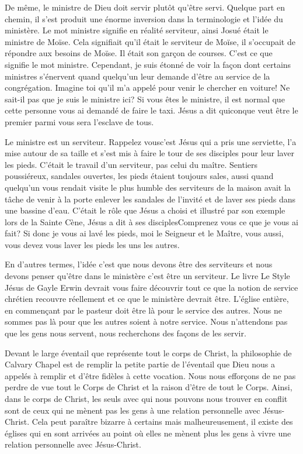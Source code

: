 De même, le ministre de Dieu doit servir plutôt qu’être servi. Quelque part en chemin, il s’est produit une énorme
inversion dans la terminologie et l’idée du ministère. Le mot \og ministre\fg{} signifie en réalité \og serviteur\fg{}, ainsi Josué était
le ministre de Moïse. Cela signifiait qu’il était le serviteur de Moïse, il s’occupait de répondre aux besoins de Moïse. Il
était son garçon de courses. C’est ce que signifie le mot \og ministre\fg{}. Cependant, je suis étonné de voir la façon dont
certains ministres s’énervent quand quelqu’un leur demande d'être au service de la congrégation. \og Imagine toi qu’il
m’a appelé pour venir le chercher en voiture! Ne sait-il pas que je suis le ministre ici?\fg{} Si vous êtes le ministre, il est
normal que cette personne vous ai demandé de faire le taxi. Jésus a dit \og quiconque veut être le premier parmi vous
sera l’esclave de tous.\fg{}

Le ministre est un serviteur. Rappelez vous\frcolon c’est Jésus qui a pris une serviette, l'a mise autour de sa taille et s’est mis
à faire le tour de ses disciples pour leur laver les pieds. C’était le travail d’un serviteur, pas celui du maître. Sentiers
poussiéreux, sandales ouvertes, les pieds étaient toujours sales, aussi quand quelqu’un vous rendait visite le plus
humble des serviteurs de la maison avait la tâche de venir à la porte enlever les sandales de l’invité et de laver ses
pieds dans une bassine d’eau. C’était le rôle que Jésus a choisi et illustré par son exemple lors de la Sainte Cène,
Jésus a dit à ses disciples\frcolon\og Comprenez vous ce que je vous ai fait? Si donc je vous ai lavé les pieds, moi le Seigneur
et le Maître, vous aussi, vous devez vous laver les pieds les uns les autres.\fg{}

En d’autres termes, l’idée c'est que nous devons être des serviteurs et nous devons penser qu'être dans le ministère
c'est être un serviteur. Le livre \og Le Style Jésus\fg{} de Gayle Erwin devrait vous faire découvrir tout ce que la notion de
service chrétien recouvre réellement et ce que le ministère devrait être. L’église entière, en commençant par le
pasteur doit être là pour le service des autres. Nous ne sommes pas là pour que les autres soient à notre service.
Nous n’attendons pas que les gens nous servent, nous recherchons des façons de les servir.

Devant le large éventail que représente tout le corps de Christ, la philosophie de Calvary Chapel est de remplir la
petite partie de l’éventail que Dieu nous a appelés à remplir et d’être fidèles à cette vocation. Nous nous efforçons de
ne pas perdre de vue tout le Corps de Christ et la raison d'être de tout le Corps. Ainsi, dans le corps de Christ, les
seuls avec qui nous pouvons nous trouver en conflit sont de ceux qui ne mènent pas les gens à une relation
personnelle avec Jésus-Christ. Cela peut paraître bizarre à certains mais malheureusement, il existe des églises qui en
sont arrivées au point où elles ne mènent plus les gens à vivre une relation personnelle avec Jésus-Christ.

